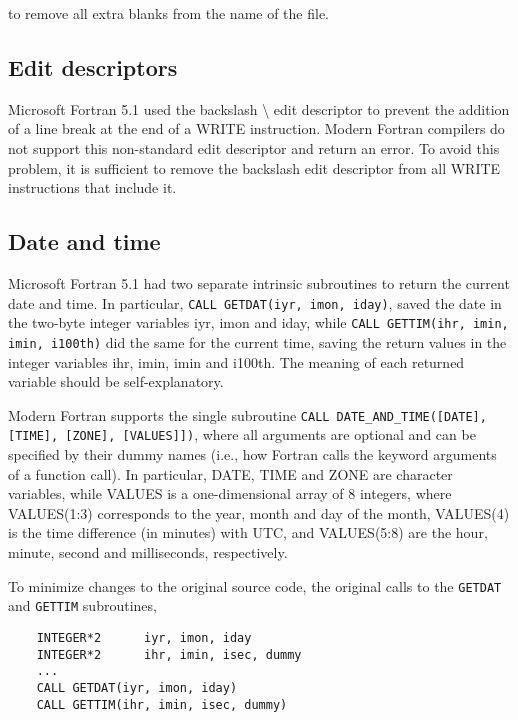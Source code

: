 to remove all extra blanks from the name of the file.



\subsection{Edit descriptors}

Microsoft Fortran 5.1 used the backslash \textbackslash{} edit descriptor to prevent the addition of a line break at the end of a \textsf{WRITE} instruction.
Modern Fortran compilers do not support this non-standard edit descriptor and return an error. To avoid this problem, it is sufficient to remove the backslash edit descriptor from all \textsf{WRITE} instructions that include it.


\subsection{Date and time}

Microsoft Fortran 5.1 had two separate intrinsic subroutines to return the current date and time.
In particular, \lstinline[columns=fixed]{CALL GETDAT(iyr, imon, iday)}, saved the date in the two-byte integer variables \textsf{iyr}, \textsf{imon} and \textsf{iday}, while \lstinline[columns=fixed]{CALL GETTIM(ihr, imin, imin, i100th)} did the same for the current time, saving the return values in the integer variables \textsf{ihr}, \textsf{imin}, \textsf{imin} and \textsf{i100th}. The meaning of each returned variable should be self-explanatory.

Modern Fortran supports the single subroutine \lstinline[columns=fixed]{CALL DATE_AND_TIME([DATE], [TIME], [ZONE], [VALUES]])}, where all arguments are optional and can be specified by their dummy names (i.e., how Fortran calls the keyword arguments of a function call). 
In particular, \textsf{DATE}, \textsf{TIME} and \textsf{ZONE} are character variables, while \textsf{VALUES} is a one-dimensional array of 8 integers, where \textsf{VALUES(1:3)} corresponds to the year, month and day of the month, \textsf{VALUES(4)} is the time difference (in minutes) with UTC, and \textsf{VALUES(5:8)} are the hour, minute, second and milliseconds, respectively.

To minimize changes to the original source code, the original calls to the \lstinline[columns=fixed]{GETDAT} and \lstinline[columns=fixed]{GETTIM} subroutines,

\begin{lstlisting}
	INTEGER*2      iyr, imon, iday
	INTEGER*2      ihr, imin, isec, dummy
	...
	CALL GETDAT(iyr, imon, iday)
	CALL GETTIM(ihr, imin, isec, dummy)
\end{lstlisting}

